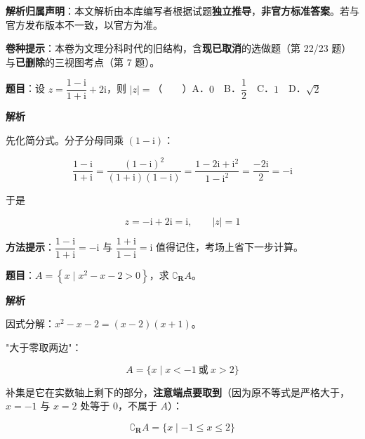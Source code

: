 

\begin{gknotice}
\textbf{ 解析归属声明}：本文解析由本库编写者根据试题\textbf{独立推导}，\textbf{非官方标准答案}。若与官方发布版本不一致，以官方为准。

\textbf{ 卷种提示}：本卷为文理分科时代的旧结构，含\textbf{现已取消}的选做题（第 22/23 题）与\textbf{已删除}的三视图考点（第 7 题）。
\end{gknotice}

\par\medskip



\textbf{题目}：设 $z=\dfrac{1-\mathrm i}{1+\mathrm i}+2\mathrm i$，则 $|z|=$（　　）A．$0$　B．$\dfrac12$　C．$1$　D．$\sqrt2$

\textbf{解析}

先化简分式。分子分母同乘 $(1-\mathrm i)$：

\[\frac{1-\mathrm i}{1+\mathrm i}=\frac{(1-\mathrm i)^{2}}{(1+\mathrm i)(1-\mathrm i)}=\frac{1-2\mathrm i+\mathrm i^{2}}{1-\mathrm i^{2}}=\frac{-2\mathrm i}2=-\mathrm i\]

于是

\[z=-\mathrm i+2\mathrm i=\mathrm i,\qquad |z|=1\]


\begin{gktip}
\textbf{方法提示}：$\dfrac{1-\mathrm i}{1+\mathrm i}=-\mathrm i$ 与 $\dfrac{1+\mathrm i}{1-\mathrm i}=\mathrm i$ 值得记住，考场上省下一步计算。
\end{gktip}

\par\medskip


\textbf{题目}：$A=\left\{x\mid x^{2}-x-2>0\right\}$，求 $\complement_{\mathbf R}A$。

\textbf{解析}

因式分解：$x^{2}-x-2=(x-2)(x+1)$。

"大于零取两边"：

\[A=\{x\mid x<-1\ \text{或}\ x>2\}\]

补集是它在实数轴上剩下的部分，\textbf{注意端点要取到}（因为原不等式是严格大于，$x=-1$ 与 $x=2$ 处等于 $0$，不属于 $A$）：

\[\complement_{\mathbf R}A=\{x\mid-1\le x\le2\}\]

